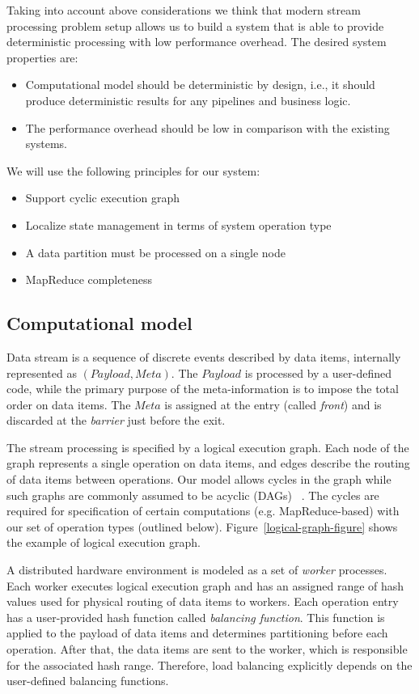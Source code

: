 Taking into account above considerations we think that modern stream processing problem setup allows us to build a system that is able to provide deterministic processing with low performance overhead. The desired system properties are:
\begin{itemize}
  \item Computational model should be deterministic by design, i.e., it should produce deterministic results for any pipelines and business logic.
  \item The performance overhead should be low in comparison with the existing systems.
\end{itemize}
We will use the following principles for our system:
\begin{itemize}
  \item Support cyclic execution graph
  \item Localize state management in terms of system operation type
  \item A data partition must be processed on a single node
  \item MapReduce completeness
\end{itemize}

\subsection {Computational model}
\label{model-section}

Data stream is a sequence of discrete events described by data items, internally represented as $(Payload, Meta)$. The $Payload$ is processed by a user-defined code, while the primary purpose of the meta-information is to impose the total order on data items. The $Meta$ is assigned at the entry (called {\em front}) and is discarded at the {\em barrier} just before the exit. 

The stream processing is specified by a logical execution graph. Each node of the graph represents a single operation on data items, and edges describe the routing of data items between operations. Our model allows cycles in the graph while such graphs are commonly assumed to be acyclic (DAGs) ~\cite{Zaharia:2016:ASU:3013530.2934664, Carbone:2017:SMA:3137765.3137777}. The cycles are required for specification of certain computations (e.g. MapReduce-based) with our set of operation types (outlined below). Figure~\ref{logical-graph-figure} shows the example of logical execution graph.

A distributed hardware environment is modeled as a set of {\em worker} processes. Each worker executes logical execution graph and has an assigned range of hash values used for physical routing of data items to workers. Each operation entry has a user-provided hash function called {\it balancing function}. This function is applied to the payload of data items and determines partitioning before each operation. After that, the data items are sent to the worker, which is responsible for the associated hash range. Therefore, load balancing explicitly depends on the user-defined balancing functions. 


